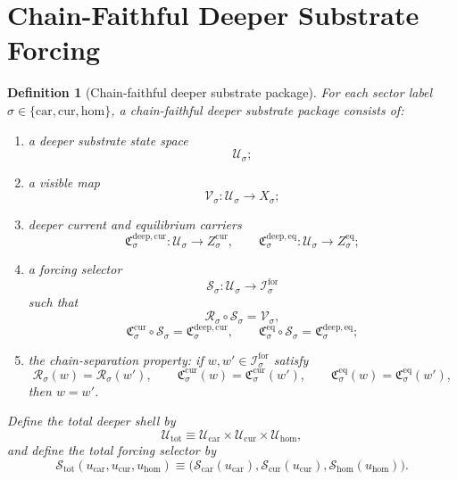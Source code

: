 \documentclass[11pt]{article}
\newcommand{\Car}{\mathrm{car}}
\newcommand{\Cur}{\mathrm{cur}}
\newcommand{\Hom}{\mathrm{hom}}
\newcommand{\ForSpace}[1]{\mathcal I_{#1}^{\mathrm{for}}}
\newcommand{\Reduction}[1]{\mathcal R_{#1}}
\newcommand{\CurrentCarrier}[1]{\mathfrak C_{#1}^{\mathrm{cur}}}
\newcommand{\EqCarrier}[1]{\mathfrak C_{#1}^{\mathrm{eq}}}
\newcommand{\DeepSpace}[1]{\mathcal U_{#1}}
\newcommand{\DeepShell}{\mathcal U_{\mathrm{tot}}}
\newcommand{\VisibleMap}[1]{\mathcal V_{#1}}
\newcommand{\DeepCurrentCarrier}[1]{\mathfrak C_{#1}^{\mathrm{deep,cur}}}
\newcommand{\DeepEqCarrier}[1]{\mathfrak C_{#1}^{\mathrm{deep,eq}}}
\newcommand{\ChainSelect}[1]{\mathcal S_{#1}}
\newcommand{\ChainSelectTriple}{\mathcal S_{\mathrm{tot}}}
\newtheorem{definition}{Definition}
\begin{document}
\section{Chain-Faithful Deeper Substrate Forcing}

\begin{definition}[Chain-faithful deeper substrate package]
\label{def:deep}
For each sector label \(\sigma\in\{\Car,\Cur,\Hom\}\), a \emph{chain-faithful deeper substrate package} consists of:
\begin{enumerate}
    \item a deeper substrate state space
    \[
    \DeepSpace{\sigma};
    \]
    \item a visible map
    \[
    \VisibleMap{\sigma}:\DeepSpace{\sigma}\to X_{\sigma};
    \]
    \item deeper current and equilibrium carriers
    \[
    \DeepCurrentCarrier{\sigma}:\DeepSpace{\sigma}\to Z_{\sigma}^{\mathrm{cur}},
    \qquad
    \DeepEqCarrier{\sigma}:\DeepSpace{\sigma}\to Z_{\sigma}^{\mathrm{eq}};
    \]
    \item a forcing selector
    \[
    \ChainSelect{\sigma}:\DeepSpace{\sigma}\to\ForSpace{\sigma}
    \]
    such that
    \begin{equation}
    \Reduction{\sigma}\circ\ChainSelect{\sigma}
    =
    \VisibleMap{\sigma},
    \label{eq:visiblecompat}
    \end{equation}
    \begin{equation}
    \CurrentCarrier{\sigma}\circ\ChainSelect{\sigma}
    =
    \DeepCurrentCarrier{\sigma},
    \qquad
    \EqCarrier{\sigma}\circ\ChainSelect{\sigma}
    =
    \DeepEqCarrier{\sigma};
    \label{eq:carriercompat}
    \end{equation}
    \item the chain-separation property: if \(w,w'\in\ForSpace{\sigma}\) satisfy
    \begin{equation}
    \Reduction{\sigma}(w)=\Reduction{\sigma}(w'),
    \qquad
    \CurrentCarrier{\sigma}(w)=\CurrentCarrier{\sigma}(w'),
    \qquad
    \EqCarrier{\sigma}(w)=\EqCarrier{\sigma}(w'),
    \label{eq:separationdata}
    \end{equation}
    then \(w=w'\).
\end{enumerate}
Define the total deeper shell by
\[
\DeepShell
\equiv
\DeepSpace{\Car}\times\DeepSpace{\Cur}\times\DeepSpace{\Hom},
\]
and define the total forcing selector by
\[
\ChainSelectTriple(u_{\Car},u_{\Cur},u_{\Hom})
\equiv
\bigl(
\ChainSelect{\Car}(u_{\Car}),
\ChainSelect{\Cur}(u_{\Cur}),
\ChainSelect{\Hom}(u_{\Hom})
\bigr).
\]
\end{definition}
\end{document}
